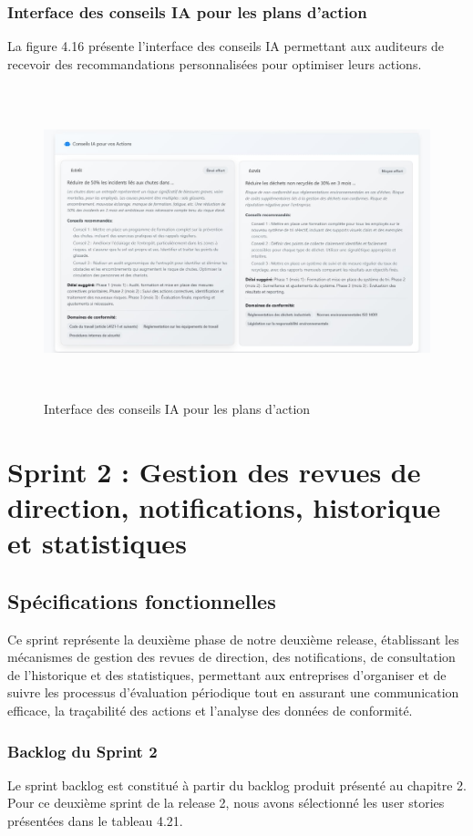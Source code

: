 \subsubsection{Interface des conseils IA pour les plans d'action}
La figure 4.16 présente l'interface des conseils IA permettant aux auditeurs de recevoir des recommandations personnalisées pour optimiser leurs actions.

\begin{figure}[H]
    \centering
    \includegraphics[width=14cm,height=9cm]{images/actionplanaiconseil.png
}
    \caption{Interface des conseils IA pour les plans d'action}
\end{figure}

\section{Sprint 2 : Gestion des revues de direction, notifications, historique et statistiques}

\subsection{Spécifications fonctionnelles}
\noindent Ce sprint représente la deuxième phase de notre deuxième release, établissant les mécanismes de gestion des revues de direction, des notifications, de consultation de l'historique et des statistiques, permettant aux entreprises d'organiser et de suivre les processus d'évaluation périodique tout en assurant une communication efficace, la traçabilité des actions et l'analyse des données de conformité.

\subsubsection{Backlog du Sprint 2}
\noindent Le sprint backlog est constitué à partir du backlog produit présenté au chapitre 2. Pour ce deuxième sprint de la release 2, nous avons sélectionné les user stories présentées dans le tableau 4.21.

